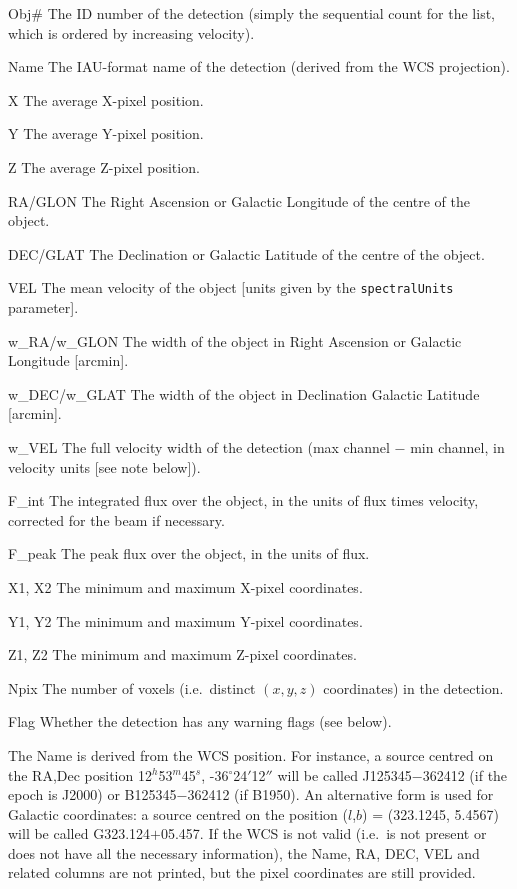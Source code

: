\documentclass[12pt,a4paper]{article}
\newcommand{\ie}{i.e.\ }
\newcommand{\entrylabel}[1]{\mbox{\textsf{\bf{#1:}}}\hfil}
\newenvironment{entry}
        {\begin{list}{}%
                {\renewcommand{\makelabel}{\entrylabel}%
                        \setlength{\labelwidth}{30mm}%
                        \setlength{\labelsep}{5pt}%
                        \setlength{\itemsep}{2pt}%
                        \setlength{\parsep}{2pt}%
                        \setlength{\leftmargin}{35mm}%
                }%
        }%
{\end{list}}
\begin{document}
\begin{entry}
\item[Obj\#] The ID number of the detection (simply the sequential
  count for the list, which is ordered by increasing velocity).
\item[Name] The IAU-format name of the detection (derived from the WCS
  projection).
\item[X] The average X-pixel position.
\item[Y] The average Y-pixel position.
\item[Z] The average Z-pixel position.
\item[RA/GLON] The Right Ascension or Galactic Longitude of the centre
of the object.
\item[DEC/GLAT] The Declination or Galactic Latitude of the centre of
the object.
\item[VEL] The mean velocity of the object [units given by the
  \texttt{spectralUnits} parameter].
\item[w\_RA/w\_GLON] The width of the object in Right Ascension or
Galactic Longitude [arcmin].
\item[w\_DEC/w\_GLAT] The width of the object in Declination Galactic
  Latitude [arcmin].
\item[w\_VEL] The full velocity width of the detection (max channel
  $-$ min channel, in velocity units [see note below]).
\item[F\_int] The integrated flux over the object, in the units of
  flux times velocity, corrected for the beam if necessary.
\item[F\_peak] The peak flux over the object, in the units of flux.
\item[X1, X2] The minimum and maximum X-pixel coordinates.
\item[Y1, Y2] The minimum and maximum Y-pixel coordinates.
\item[Z1, Z2] The minimum and maximum Z-pixel coordinates.
\item[Npix] The number of voxels (\ie distinct $(x,y,z)$ coordinates)
  in the detection.
\item[Flag] Whether the detection has any warning flags (see below). 
\end{entry}
The Name is derived from the WCS position. For instance, a source
centred on the RA,Dec position 12$^h$53$^m$45$^s$,
-36$^\circ$24$'$12$''$ will be called J125345$-$362412 (if the epoch
is J2000) or B125345$-$362412 (if B1950). An alternative form is used
for Galactic coordinates: a source centred on the position ($l$,$b$) =
(323.1245, 5.4567) will be called G323.124$+$05.457. If the WCS is not
valid (\ie is not present or does not have all the necessary
information), the Name, RA, DEC, VEL and related columns are not
printed, but the pixel coordinates are still provided.
\end{document}
